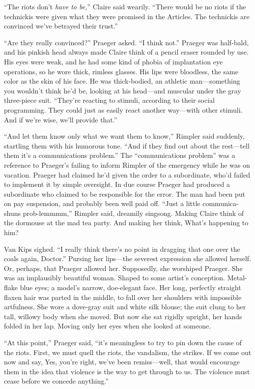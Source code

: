 ``The riots don't \textit{have to be,}'' Claire said wearily. ``There would be no riots if the technickis were given what they were promised in the Articles. The technickis are convinced we've betrayed their trust.''

``Are they really convinced?'' Praeger asked. ``I think not.'' Praeger was half-bald, and his pinkish head always made Claire think of a pencil eraser rounded by use. His eyes were weak, and he had some kind of phobia of implantation eye operations, so he wore thick, rimless glasses. His lips were bloodless, the same color as the skin of his face. He was thick-bodied, an athletic man---something you wouldn't think he'd be, looking at his head---and muscular under the gray three-piece suit. ``They're reacting to stimuli, according to their social programming. They could just as easily react another way---with other stimuli. And if we're wise, we'll provide that.''

``And let them know only what we want them to know,'' Rimpler said suddenly, startling them with his humorous tone. ``And if they find out about the rest---tell them it's a communications problem.'' The ``communications problem'' was a reference to Praeger's failing to inform Rimpler of the emergency while he was on vacation. Praeger had claimed he'd given the order to a subordinate, who'd failed to implement it by simple oversight. In due course Praeger had produced a subordinate who claimed to be responsible for the error. The man had been put on pay suspension, and probably been well paid off. ``Just a little communica-shuns prob-lemmmm,'' Rimpler said, dreamily singsong. Making Claire think of the dormouse at the mad tea party. And making her think, What's happening to him?

Van Kips sighed. ``I really think there's no point in dragging that one over the coals again, Doctor.'' Pursing her lips---the severest expression she allowed herself. Or, perhaps, that Praeger allowed her. Supposedly, she worshiped Praeger. She was an implausibly beautiful woman. Shaped to some artist's conception. Metal-flake blue eyes; a model's narrow, doe-elegant face. Her long, perfectly straight flaxen hair was parted in the middle, to fall over her shoulders with impossible artfulness. She wore a dove-gray suit and white silk blouse; the suit clung to her tall, willowy body when she moved. But now she sat rigidly upright, her hands folded in her lap. Moving only her eyes when she looked at someone.

``At this point,'' Praeger said, ``it's meaningless to try to pin down the cause of the riots. First, we must quell the riots, the vandalism, the strikes. If we come out now and say, Yes, you're right, we've been remiss---well, that would encourage them in the idea that violence is the way to get through to us. The violence must cease before we concede anything.''

